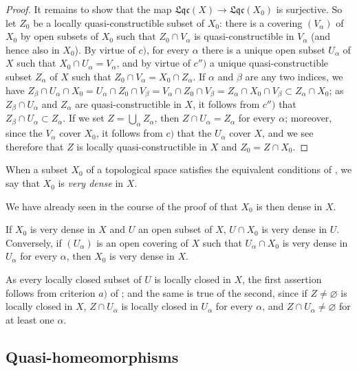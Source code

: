 \begin{proof}
It remains to show that the map $\mathfrak{Lqc}(X)\to\mathfrak{Lqc}(X_0)$ is surjective.
So let $Z_0$ be a locally quasi-constructible subset of $X_0$: there is a covering $(V_\alpha)$ of $X_0$ by open subsets of $X_0$ such that $Z_0\cap V_\alpha$ is quasi-constructible in $V_\alpha$ (and
hence also in $X_0$).
By virtue of $c)$, for every $\alpha$ there is a unique open subset $U_\alpha$ of $X$ such that $X_0\cap U_\alpha=V_\alpha$, and by virtue of $c'')$ a unique quasi-constructible subset $Z_\alpha$ of $X$ such that $Z_0\cap V_\alpha=X_0\cap Z_\alpha$.
If $\alpha$ and $\beta$ are any two indices, we have $Z_\beta\cap U_\alpha\cap X_0=U_\alpha\cap Z_0\cap V_\beta=V_\alpha\cap Z_0\cap V_\beta=Z_\alpha\cap X_0\cap V_\beta\subset Z_\alpha\cap X_0$; as $Z_\beta\cap U_\alpha$ and $Z_\alpha$ are quasi-constructible in $X$, it follows from $c'')$ that $Z_\beta\cap U_\alpha\subset Z_\alpha$.
If we set $Z=\bigcup_\alpha Z_\alpha$, then $Z\cap U_\alpha=Z_\alpha$ for every $\alpha$; moreover, since the $V_\alpha$ cover $X_0$, it follows from $c)$ that the $U_\alpha$ cover $X$, and we see therefore that $Z$ is locally quasi-constructible in $X$ and $Z_0=Z\cap X_0$.
\end{proof}

\begin{definition}[10.1.3]
\label{IV.10.1.3}
When a subset $X_0$ of a topological space satisfies the equivalent conditions of , we say that $X_0$ is \emph{very dense} in $X$.
\end{definition}

We have already seen in the course of the proof of  that $X_0$ is then dense in $X$.

\begin{corollary}[10.1.4]
\label{IV.10.1.4}
If $X_0$ is very dense in $X$ and $U$ an open subset of $X$, $U\cap X_0$ is very dense in $U$.
Conversely, if $(U_\alpha)$ is an open covering of $X$ such that $U_\alpha\cap X_0$ is very dense in $U_\alpha$ for every $\alpha$, then $X_0$ is very dense in $X$.
\end{corollary}

As every locally closed subset of $U$ is locally closed in $X$, the first assertion follows from criterion $a)$ of ; and the same is true of the second, since if $Z\neq\varnothing$ is locally closed in $X$, $Z\cap U_\alpha$ is locally closed in $U_\alpha$ for every $\alpha$, and $Z\cap U_\alpha\neq\varnothing$ for at least one $\alpha$.

\subsection{Quasi-homeomorphisms}
\label{subsection:IV.10.2}

